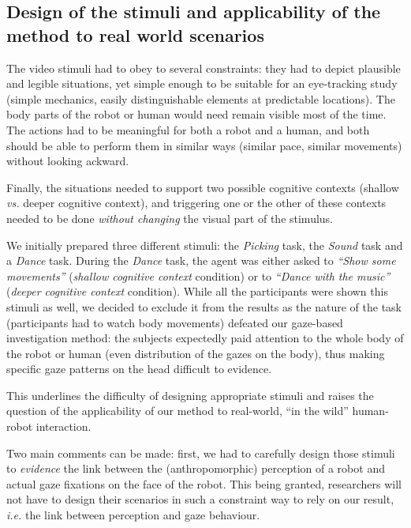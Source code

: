 \documentclass[lettersize, noapacite, twoside, HRI]{apa_HRI}
\newcommand{\ie}{\textit{i.e.}\xspace}
\newcommand{\vs}{\textit{vs.}\xspace}
\begin{document}
\subsection{Design of the stimuli and applicability of the method to real world
scenarios}
\label{stimuli_design}

The video stimuli had to obey to several constraints: they had to depict
plausible and legible situations, yet simple enough to be suitable for an
eye-tracking study (simple mechanics, easily distinguishable elements at
predictable locations). The body parts of the robot or human would need remain
visible most of the time. The actions had to be meaningful for both a robot and
a human, and both should be able to perform them in similar ways (similar pace,
similar movements) without looking ackward.

Finally, the situations needed to support two possible cognitive contexts
(shallow \vs deeper cognitive context), and triggering one or the other of these
contexts needed to be done \emph{without changing} the visual part of the
stimulus.

We initially prepared three different stimuli: the \emph{Picking} task, the
\emph{Sound} task and a \emph{Dance} task.  During the \emph{Dance} task, the
agent was either asked to \emph{``Show some movements''} (\emph{shallow
cognitive context} condition) or to \emph{``Dance with the music''}
(\emph{deeper cognitive context} condition). While all the participants were
shown this stimuli as well, we decided to exclude it from the results as the
nature of the task (participants had to watch body movements) defeated our
gaze-based investigation method: the subjects expectedly paid attention to the
whole body of the robot or human (even distribution of the gazes on the body),
thus making specific gaze patterns on the head difficult to evidence.

This underlines the difficulty of designing appropriate stimuli and raises the
question of the applicability of our method to real-world, ``in the wild''
human-robot interaction.

Two main comments can be made: first, we had to carefully design those stimuli
to \emph{evidence} the link between the (anthropomorphic) perception of a robot
and actual gaze fixations on the face of the robot. This being granted,
researchers will not have to design their scenarios in such a constraint way to
rely on our result, \ie the link between perception and gaze behaviour.
\end{document}

